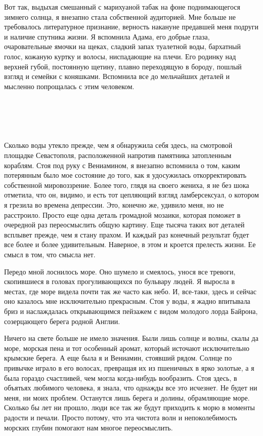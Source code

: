 \documentclass[
]{book}
\begin{document}
Вот так, выдыхая смешанный с марихуаной табак на фоне поднимающегося зимнего солнца, я внезапно стала собственной аудиторией. Мне больше не требовалось литературное признание, верность накануне предавшей меня подруги и наличие спутника жизни. Я вспомнила Адама, его добрые глаза, очаровательные ямочки на щеках, сладкий запах туалетной воды, бархатный голос, кожаную куртку и волосы, ниспадающие на плечи. Его родинку над верхней губой, постоянную щетину, плавно переходящую в бороду, пошлый взгляд и семейки с коняшками. Вспомнила все до мельчайших деталей и мысленно попрощалась с этим человеком.

\hypertarget{chapter-27}{%
\chapter{~}\label{chapter-27}}

Сколько воды утекло прежде, чем я обнаружила себя здесь, на смотровой площадке Севастополя, расположенной напротив памятника затопленным кораблям. Стоя под руку с Вениамином, я внезапно вспомнила о том, каким потерянным было мое состояние до того, как я удосужилась откорректировать собственной мировоззрение. Более того, глядя на своего жениха, я не без шока отметила, что он, видимо, и есть тот цепляющий взгляд ламберсексуал, о котором я грезила во времена депрессии. Это, конечно же, удивило меня, но не расстроило. Просто еще одна деталь громадной мозаики, которая поможет в очередной раз переосмыслить общую картину. Еще тысяча таких вот деталей всплывет прежде, чем я стану прахом. И каждый раз конечный результат будет все более и более удивительным. Наверное, в этом и кроется прелесть жизни. Ее смысл в том, что смысла нет.

Передо мной лоснилось море. Оно шумело и смеялось, унося все тревоги, скопившиеся в головах прогуливающихся по бульвару людей. Я выросла в местах, где море видела почти так же часто как небо. И, все-таки, здесь и сейчас оно казалось мне исключительно прекрасным. Стоя у воды, я жадно впитывала бриз и наслаждалась открывающимся пейзажем с видом молодого лорда Байрона, созерцающего берега родной Англии.

Ничего на свете больше не имело значения. Были лишь солнце и волны, скалы да море, морская пена и тот особенный аромат, который источают исключительно крымские берега. А еще была я и Вениамин, стоявший рядом. Солнце по привычке играло в его волосах, превращая их из пшеничных в ярко золотые, а я была гораздо счастливей, чем могла когда-нибудь вообразить. Стоя здесь, в объятьях любимого человека, я знала, что однажды все это исчезнет. Не будет ни меня, ни моих проблем. Останутся лишь берега и долины, обрамляющие море. Сколько бы лет ни прошло, люди все так же будут приходить к морю в моменты радости и печали. Просто потому, что эта чистота волн и непоколебимость морских глубин помогают нам многое переосмыслить.
\end{document}
